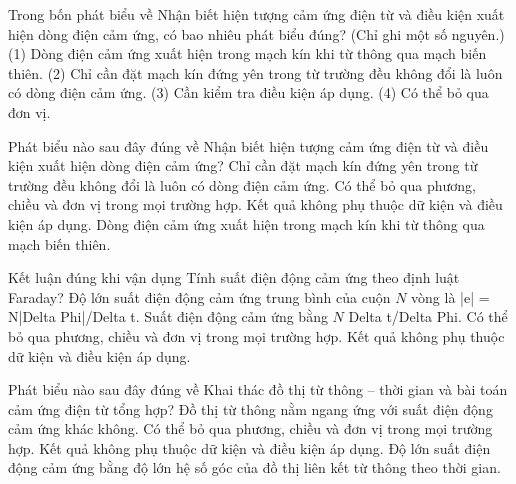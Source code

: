 \begin{ex}
Trong bốn phát biểu về Nhận biết hiện tượng cảm ứng điện từ và điều kiện xuất hiện dòng điện cảm ứng, có bao nhiêu phát biểu đúng? (Chỉ ghi một số nguyên.) (1) Dòng điện cảm ứng xuất hiện trong mạch kín khi từ thông qua mạch biến thiên. (2) Chỉ cần đặt mạch kín đứng yên trong từ trường đều không đổi là luôn có dòng điện cảm ứng. (3) Cần kiểm tra điều kiện áp dụng. (4) Có thể bỏ qua đơn vị.
\end{ex}

\begin{ex}
Phát biểu nào sau đây đúng về Nhận biết hiện tượng cảm ứng điện từ và điều kiện xuất hiện dòng điện cảm ứng?
\choice
{Chỉ cần đặt mạch kín đứng yên trong từ trường đều không đổi là luôn có dòng điện cảm ứng.}
{Có thể bỏ qua phương, chiều và đơn vị trong mọi trường hợp.}
{Kết quả không phụ thuộc dữ kiện và điều kiện áp dụng.}
{\True Dòng điện cảm ứng xuất hiện trong mạch kín khi từ thông qua mạch biến thiên.}
\end{ex}

\begin{ex}
Kết luận đúng khi vận dụng Tính suất điện động cảm ứng theo định luật Faraday?
\choice
{\True Độ lớn suất điện động cảm ứng trung bình của cuộn $N$ vòng là |e| = N|Delta Phi|/Delta t.}
{Suất điện động cảm ứng bằng $N$ Delta t/Delta Phi.}
{Có thể bỏ qua phương, chiều và đơn vị trong mọi trường hợp.}
{Kết quả không phụ thuộc dữ kiện và điều kiện áp dụng.}
\end{ex}

\begin{ex}
Phát biểu nào sau đây đúng về Khai thác đồ thị từ thông – thời gian và bài toán cảm ứng điện từ tổng hợp?
\choice
{Đồ thị từ thông nằm ngang ứng với suất điện động cảm ứng khác không.}
{Có thể bỏ qua phương, chiều và đơn vị trong mọi trường hợp.}
{Kết quả không phụ thuộc dữ kiện và điều kiện áp dụng.}
{\True Độ lớn suất điện động cảm ứng bằng độ lớn hệ số góc của đồ thị liên kết từ thông theo thời gian.}
\end{ex}


